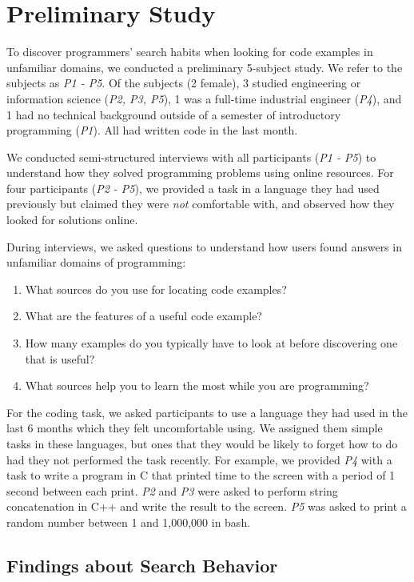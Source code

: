 \section{Preliminary Study}

To discover programmers' search habits when looking for code examples in unfamiliar domains, we conducted a preliminary 5-subject study.
We refer to the subjects as \emph{P1 - P5}.
Of the subjects (2 female), 3 studied engineering or information science (\emph{P2, P3, P5}), 1 was a full-time industrial engineer (\emph{P4}), and 1 had no technical background outside of a semester of introductory programming (\emph{P1}).
All had written code in the last month.

We conducted semi-structured interviews with all participants (\emph{P1 - P5}) to understand how they solved programming problems using online resources.
For four participants (\emph{P2 - P5}), we provided a task in a language they had used previously but claimed they were \emph{not} comfortable with, and observed how they looked for solutions online.

During interviews, we asked questions to understand how users found answers in unfamiliar domains of programming:
\begin{enumerate}[noitemsep]
\item What sources do you use for locating code examples?
\item What are the features of a useful code example?
\item How many examples do you typically have to look at before discovering one that is useful?
\item What sources help you to learn the most while you are programming?
\end{enumerate}

For the coding task, we asked participants to use a language they had used in the last 6 months which they felt uncomfortable using.
We assigned them simple tasks in these languages, but ones that they would be likely to forget how to do had they not performed the task recently.
For example, we provided \emph{P4} with a task to write a program in C that printed time to the screen with a period of 1 second between each print.
\emph{P2} and \emph{P3} were asked to perform string concatenation in C++ and write the result to the screen.
\emph{P5} was asked to print a random number between 1 and 1,000,000 in bash.

\subsection{Findings about Search Behavior}

